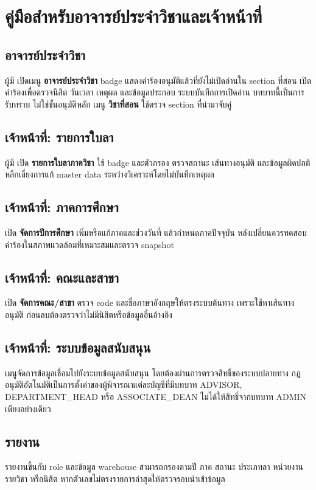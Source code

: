 \section{คู่มือสำหรับอาจารย์ประจำวิชาและเจ้าหน้าที่}
\subsection{อาจารย์ประจำวิชา}
ผู้มี  เปิดเมนู \textbf{อาจารย์ประจำวิชา} badge แสดงคำร้องอนุมัติแล้วที่ยังไม่เปิดอ่านใน section ที่สอน เปิดคำร้องเพื่อตรวจนิสิต วันเวลา เหตุผล และข้อมูลประกอบ ระบบบันทึกการเปิดอ่าน บทบาทนี้เป็นการรับทราบ ไม่ใช่ขั้นอนุมัติหลัก เมนู \textbf{วิชาที่สอน} ใช้ตรวจ section ที่นำมาจับคู่

\subsection{เจ้าหน้าที่: รายการใบลา}
ผู้มี  เปิด \textbf{รายการใบลาภาควิชา} ใช้ badge และตัวกรอง ตรวจสถานะ เส้นทางอนุมัติ และข้อมูลผิดปกติ หลีกเลี่ยงการแก้ master data ระหว่างวิเคราะห์โดยไม่บันทึกเหตุผล

\subsection{เจ้าหน้าที่: ภาคการศึกษา}
เปิด \textbf{จัดการปีการศึกษา} เพิ่มหรือแก้ภาคและช่วงวันที่ แล้วกำหนดภาคปัจจุบัน หลังเปลี่ยนควรทดสอบคำร้องในสภาพแวดล้อมที่เหมาะสมและตรวจ snapshot

\subsection{เจ้าหน้าที่: คณะและสาขา}
เปิด \textbf{จัดการคณะ/สาขา} ตรวจ code และชื่อภาษาอังกฤษให้ตรงระบบต้นทาง เพราะใช้หาเส้นทางอนุมัติ ก่อนลบต้องตรวจว่าไม่มีนิสิตหรือข้อมูลอื่นอ้างอิง

\subsection{เจ้าหน้าที่: ระบบข้อมูลสนับสนุน}
เมนูจัดการข้อมูลเชื่อมไปยังระบบข้อมูลสนับสนุน โดยต้องผ่านการตรวจสิทธิ์ของระบบปลายทาง กฎอนุมัติอัตโนมัติเป็นการตั้งค่าของผู้พิจารณาแต่ละบัญชีที่มีบทบาท ADVISOR, DEPARTMENT\_HEAD หรือ ASSOCIATE\_DEAN ไม่ได้ให้สิทธิ์จากบทบาท ADMIN เพียงอย่างเดียว

\subsection{รายงาน}
รายงานขึ้นกับ role และข้อมูล warehouse สามารถกรองตามปี ภาค สถานะ ประเภทลา หน่วยงาน รายวิชา หรือนิสิต หากตัวเลขไม่ตรงรายการล่าสุดให้ตรวจรอบนำเข้าข้อมูล

